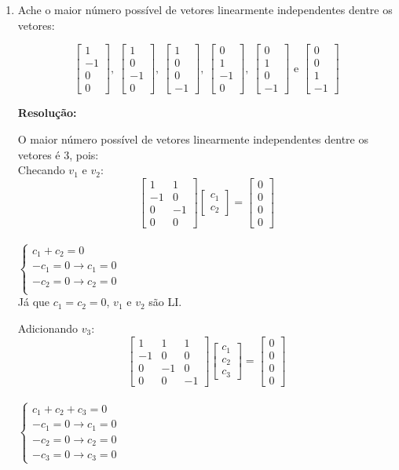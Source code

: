 \documentclass[leqno]{article}
\numberwithin{equation}{section}
\newcommand{\bvecfour}[4]{%
	\begin{bmatrix} #1 \\ #2 \\ #3 \\ #4 \end{bmatrix}
}
\newenvironment{sol}
{
	\vspace{4mm}
	\noindent\textbf{Resolução:}
	\strut\newline
	\smallskip
	\hspace{-3.5mm}
}
{}
\begin{document}
\begin{enumerate}
		\item Ache o maior número possível de vetores linearmente independentes dentre os vetores:
		
		$$\bvecfour{1}{-1}{0}{0}, \ \bvecfour{1}{0}{-1}{0}, \ \bvecfour{1}{0}{0}{-1}, \ \bvecfour{0}{1}{-1}{0}, \ \bvecfour{0}{1}{0}{-1} \mbox{ e } \bvecfour{0}{0}{1}{-1}$$
		
		\begin{sol} 
			O maior número possível de vetores linearmente independentes dentre os vetores é 3, pois:\\
			Checando $v_1$ e $v_2$:\\
			$$\begin{bmatrix} 
				1 & 1\\
				-1 & 0\\
				0 & -1\\
				0 & 0\end{bmatrix}
			\begin{bmatrix} 
				c_1\\
				c_2
			\end{bmatrix} =
			\begin{bmatrix} 
				0\\
				0\\
				0\\
				0
			\end{bmatrix}$$ \\
		$
		\left\{
		\begin {array}{cl}
		c_1 + c_2 = 0 \\
		-c_1 = 0 \rightarrow c_1 = 0 \\
		-c_2 = 0 \rightarrow c_2 = 0 \\
		\end{array}
		\right.
		$\\
		
		
		Já que $c_1 = c_2 = 0$, $v_1$ e $v_2$ são LI.
		
		Adicionando $v_3$:\\
			$$\begin{bmatrix} 
				1 & 1 & 1\\
				-1 & 0 & 0\\
				0 & -1 & 0\\
				0 & 0 & -1\end{bmatrix}
			\begin{bmatrix} 
				c_1\\
				c_2\\
				c_3
			\end{bmatrix} =
			\begin{bmatrix} 
				0\\
				0\\
				0\\
				0
			\end{bmatrix}$$ \\
		$
		\left\{
		\begin {array}{cl}
		c_1 + c_2 + c_3 = 0 \\
		-c_1 = 0 \rightarrow c_1 = 0 \\
		-c_2 = 0 \rightarrow c_2 = 0 \\
		-c_3 = 0 \rightarrow c_3 = 0
		\end{array}
		\right.
		$\\
		

\end{sol}
\end{enumerate}
\end{document}

